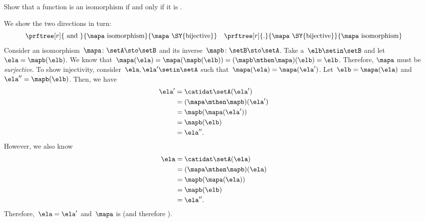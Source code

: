 \begin{exercise}
    \label{ex:bijective-functions-are-isomorphisms}
    Show that a function is an isomorphism if and only if it is .
\end{exercise}
\begin{solution}
    We show the two directions in turn:
    \begin{equation}
        \prftree[r]{\text{ and }}{\mapa \text{ isomorphism}}{\mapa \text{ \SY{bijective}}} \quad \prftree[r]{.
        }{\mapa \text{ \SY{bijective}}}{\mapa \text{ isomorphism}}
    \end{equation}
    Consider an isomorphism~$\mapa\colon \setA \sto \setB$ and its inverse~$\mapb\colon \setB \sto \setA$.
    Take a~$\elb\setin\setB$ and let~$\ela= \mapb(\elb)$.
    We know that~$\mapa(\ela)=\mapa(\mapb(\elb))=(\mapb\mthen \mapa)(\elb)=\elb$.
    Therefore, $\mapa$ must be \emph{surjective}.
    To show injectivity, consider~$\ela,\ela'\setin\setA$ such that~$\mapa(\ela)=\mapa(\ela')$.
    Let~$\elb=\mapa(\ela)$ and~$\ela''=\mapb(\elb)$.
    Then, we have
    \begin{equation}
        \begin{aligned}
            \ela' & =\catidat\setA(\ela') \\
                  & =(\mapa \mthen \mapb)(\ela') \\
                  & =\mapb(\mapa(\ela')) \\
                  & =\mapb(\elb) \\
                  & =\ela''.
        \end{aligned}
    \end{equation}
    However, we also know
    \begin{equation}
        \begin{aligned}
            \ela & =\catidat\setA(\ela) \\
                 & =(\mapa \mthen \mapb)(\ela) \\
                 & =\mapb(\mapa(\ela)) \\
                 & =\mapb(\elb) \\
                 & =\ela''.
        \end{aligned}
    \end{equation}
    Therefore,~$\ela=\ela'$ and~$\mapa$ is  (and therefore ).


\end{solution}

